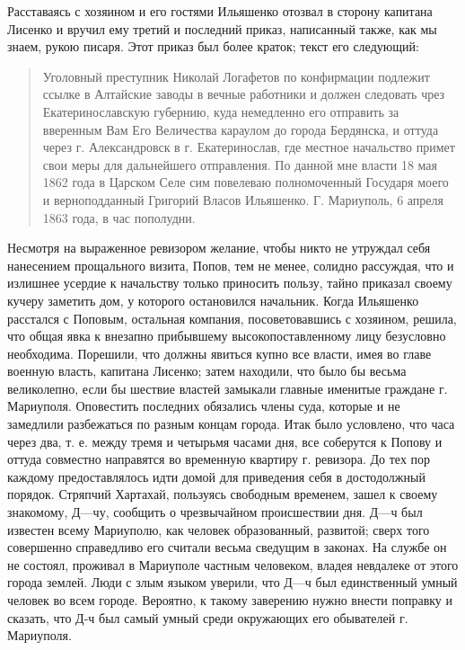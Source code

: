 \documentclass[a4paper,20pt]{report}
\begin{document}
Расставаясь с хозяином и его гостями Ильяшенко
отозвал в сторону капитана Лисенко и вручил ему третий
и последний приказ, написанный также, как мы знаем,
рукою писаря. Этот приказ был более краток; текст
его следующий: 

\begin{quote}
\em\bfseries
	
Уголовный преступник Николай Логафетов по конфирмации подлежит ссылке в
Алтайские заводы в вечные работники и должен следовать чрез
Екатеринославскую губернию, куда немедленно его отправить за вверенным
Вам Его Величества караулом до города Бердянска, и оттуда через г.
Александровск в г. Екатеринослав, где местное начальство примет свои
меры для дальнейшего отправления. По данной мне власти 18 мая 1862 года
в Царском Селе сим повелеваю полномоченный Государя моего и
верноподданный Григорий Власов Ильяшенко. Г. Мариуполь, 6 апреля 1863
года, в час пополудни.

\end{quote}

Несмотря на выраженное ревизором желание, чтобы
никто не утруждал себя нанесением прощального визита,
Попов, тем не менее, солидно рассуждая, что и излишнее
усердие к начальству только приносить пользу, тайно приказал 
своему кучеру заметить дом, у которого остановился
начальник. Когда Ильяшенко расстался с Поповым, остальная компания, 
посоветовавшись с хозяином, решила, что
общая явка к внезапно прибывшему высокопоставленному
лицу безусловно необходима. Порешили, что должны явиться
купно все власти, имея во главе военную власть, капитана
Лисенко; затем находили, что было бы весьма великолепно,
если бы шествие властей замыкали главные именитые
граждане г. Мариуполя. Оповестить последних обязались
члены суда, которые и не замедлили разбежаться по разным концам города. Итак
было условлено, что часа через два, т. е. между тремя и четырьмя часами дня,
все соберутся к Попову и оттуда совместно направятся во временную квартиру г.
ревизора. До тех пор каждому предоставлялось идти домой
для приведения себя в достодолжный порядок. Стряпчий Хартахай, пользуясь
свободным временем, зашел к своему знакомому, Д—чу, сообщить о чрезвычайном
происшествии дня. Д—ч был известен всему Мариуполю, как человек образованный,
развитой; сверх того совершенно справедливо его считали весьма сведущим в
законах.  На службе он не состоял, проживал в Мариуполе частным человеком,
владея невдалеке от этого города землей. Люди с злым языком уверили, что Д—ч
был единственный умный человек во всем городе. Вероятно, к такому заверению
нужно внести поправку и сказать, что Д-ч был самый умный среди окружающих его
обывателей г. Мариуполя.
\end{document}
